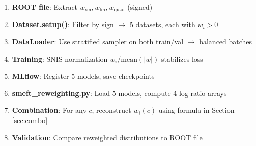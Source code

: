 \documentclass[11pt,a4paper]{article}
\begin{document}
\begin{enumerate}
  \item \textbf{ROOT file}: Extract $w_{\text{sm}}, w_{\text{lin}}, w_{\text{quad}}$ (signed)
  \item \textbf{Dataset.setup()}: Filter by sign $\to$ 5 datasets, each with $w_i > 0$
  \item \textbf{DataLoader}: Use stratified sampler on both train/val $\to$ balanced batches
  \item \textbf{Training}: SNIS normalization $w_i / \text{mean}(|w|)$ stabilizes loss
  \item \textbf{MLflow}: Register 5 models, save checkpoints
  \item \textbf{smeft\_reweighting.py}: Load 5 models, compute 4 log-ratio arrays
  \item \textbf{Combination}: For any $c$, reconstruct $w_i(c)$ using formula in Section \ref{sec:combo}
  \item \textbf{Validation}: Compare reweighted distributions to ROOT file
\end{enumerate}
\end{document}
